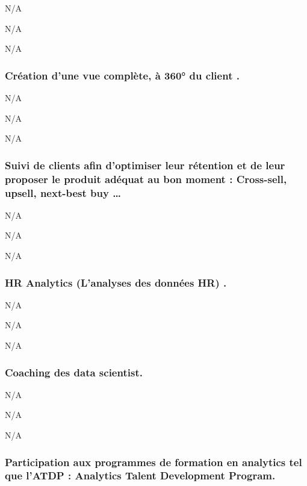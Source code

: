 \documentclass[]{article}
\begin{document}
N/A

N/A

N/A

\hypertarget{cruxe9ation-dune-vue-compluxe8te-uxe0-360-du-client-.}{%
\subsubsection{Création d'une vue complète, à 360° du client
.}\label{cruxe9ation-dune-vue-compluxe8te-uxe0-360-du-client-.}}

N/A

N/A

N/A

\hypertarget{suivi-de-clients-afin-doptimiser-leur-ruxe9tention-et-de-leur-proposer-le-produit-aduxe9quat-au-bon-moment-cross-sell-upsell-next-best-buy}{%
\subsubsection{Suivi de clients afin d'optimiser leur rétention et de
leur proposer le produit adéquat au bon moment : Cross-sell, upsell,
next-best buy
\ldots{}}\label{suivi-de-clients-afin-doptimiser-leur-ruxe9tention-et-de-leur-proposer-le-produit-aduxe9quat-au-bon-moment-cross-sell-upsell-next-best-buy}}

N/A

N/A

N/A

\hypertarget{hr-analytics-lanalyses-des-donnuxe9es-hr-.}{%
\subsubsection{HR Analytics (L'analyses des données HR)
.}\label{hr-analytics-lanalyses-des-donnuxe9es-hr-.}}

N/A

N/A

N/A

\hypertarget{coaching-des-data-scientist.}{%
\subsubsection{Coaching des data
scientist.}\label{coaching-des-data-scientist.}}

N/A

N/A

N/A

\hypertarget{participation-aux-programmes-de-formation-en-analytics-tel-que-latdp-analytics-talent-development-program.}{%
\subsubsection{Participation aux programmes de formation en analytics
tel que l'ATDP : Analytics Talent Development
Program.}\label{participation-aux-programmes-de-formation-en-analytics-tel-que-latdp-analytics-talent-development-program.}}
\end{document}
